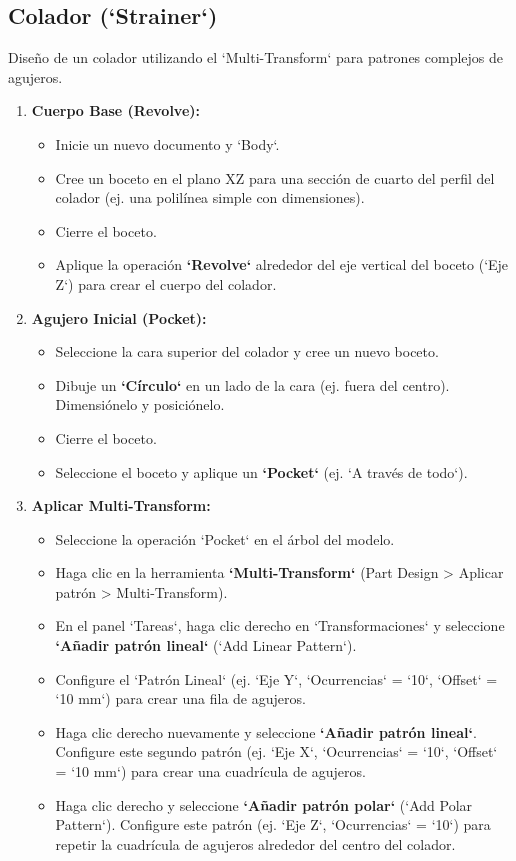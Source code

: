 \documentclass[12pt]{article}
\begin{document}
\subsection{Colador (`Strainer`)}
Diseño de un colador utilizando el `Multi-Transform` para patrones complejos de agujeros.
\begin{enumerate}[label=\arabic*)]
    \item \textbf{Cuerpo Base (Revolve):}
    \begin{itemize}[label=\textendash]
        \item Inicie un nuevo documento y `Body`.
        \item Cree un boceto en el plano XZ para una sección de cuarto del perfil del colador (ej. una polilínea simple con dimensiones).
        \item Cierre el boceto.
        \item Aplique la operación \textbf{`Revolve`} alrededor del eje vertical del boceto (`Eje Z`) para crear el cuerpo del colador.
    \end{itemize}
    \item \textbf{Agujero Inicial (Pocket):}
    \begin{itemize}[label=\textendash]
        \item Seleccione la cara superior del colador y cree un nuevo boceto.
        \item Dibuje un \textbf{`Círculo`} en un lado de la cara (ej. fuera del centro). Dimensiónelo y posiciónelo.
        \item Cierre el boceto.
        \item Seleccione el boceto y aplique un \textbf{`Pocket`} (ej. `A través de todo`).
    \end{itemize}
    \item \textbf{Aplicar Multi-Transform:}
    \begin{itemize}[label=\textendash]
        \item Seleccione la operación `Pocket` en el árbol del modelo.
        \item Haga clic en la herramienta \textbf{`Multi-Transform`} (Part Design > Aplicar patrón > Multi-Transform).
        \item En el panel `Tareas`, haga clic derecho en `Transformaciones` y seleccione \textbf{`Añadir patrón lineal`} (`Add Linear Pattern`).
        \item Configure el `Patrón Lineal` (ej. `Eje Y`, `Ocurrencias` = `10`, `Offset` = `10 mm`) para crear una fila de agujeros.
        \item Haga clic derecho nuevamente y seleccione \textbf{`Añadir patrón lineal`}. Configure este segundo patrón (ej. `Eje X`, `Ocurrencias` = `10`, `Offset` = `10 mm`) para crear una cuadrícula de agujeros.
        \item Haga clic derecho y seleccione \textbf{`Añadir patrón polar`} (`Add Polar Pattern`). Configure este patrón (ej. `Eje Z`, `Ocurrencias` = `10`) para repetir la cuadrícula de agujeros alrededor del centro del colador.
    \end{itemize}
\end{enumerate}
\end{document}
